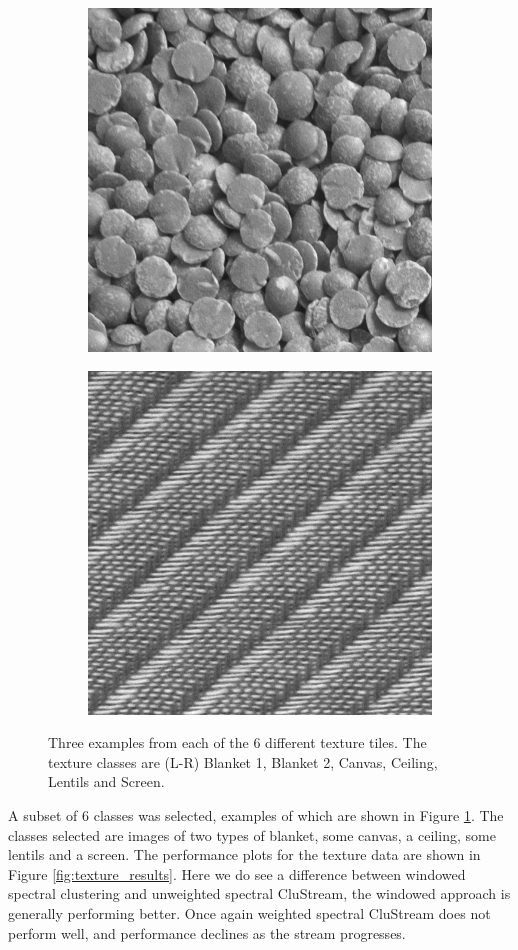 \begin{figure}[H]
\begin{subfigure}{.15\textwidth}
  \includegraphics[width=.8\linewidth]{kylberg_examples/lentils1_003.png}
\end{subfigure}
\begin{subfigure}{.15\textwidth}
  \centering
  \includegraphics[width=.8\linewidth]{kylberg_examples/screen1_003.png}
\end{subfigure}
\caption{Three examples from each of the 6 different texture tiles. The texture classes are (L-R) Blanket 1, Blanket 2, Canvas, Ceiling, Lentils and Screen.}
\label{fig:texture_examples}
\end{figure}
A subset of 6 classes was selected,  examples of which are shown in Figure \ref{fig:texture_examples}.  The classes selected are images of two types of blanket, some canvas, a ceiling, some lentils and a screen. The performance plots for the texture data are shown in Figure \ref{fig:texture_results}. Here we  do see a difference between windowed spectral clustering and unweighted spectral CluStream, the windowed approach is generally performing better. Once again weighted spectral CluStream does not perform well, and performance declines as the stream progresses.

